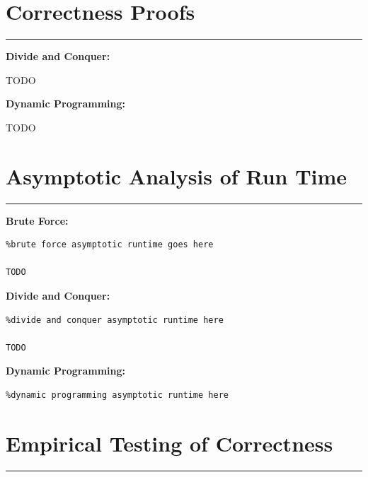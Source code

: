 \documentclass[letterpaper,10pt,titlepage,fleqn]{article}
\begin{document}
\section*{Correctness Proofs}
\hrule

\begin{centering}
\textbf{Divide and Conquer:}
\end{centering}


TODO

\begin{centering}
\textbf{Dynamic Programming:}
\end{centering}


TODO

\section*{Asymptotic Analysis of Run Time}
\hrule
\begin{centering}
\textbf{Brute Force:}
\end{centering}

\begin{lstlisting}%brute force asymptotic runtime goes here

TODO

\end{lstlisting}

\begin{centering}
\textbf{Divide and Conquer:}
\end{centering}

\begin{lstlisting}%divide and conquer asymptotic runtime here

TODO

\end{lstlisting}

\begin{centering}
\textbf{Dynamic Programming:}
\end{centering}

\begin{lstlisting}%dynamic programming asymptotic runtime here

\end{lstlisting}

\section*{Empirical Testing of Correctness}
\hrule
\end{document}
